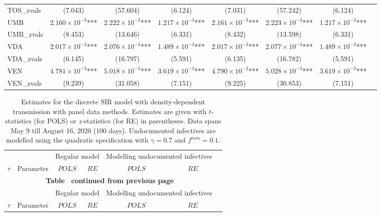 \documentclass[12pt]{article}
\begin{document}
\begin{appendices}
\begin{landscape}
\begin{longtable}{@{}lccccccc@{}}
            TOS\_zvals & (7.043) & (57.604) & (6.124) & (7.031) & (57.242) & (6.124) \\ 
            UMB & $2.160 \times 10^{-3}$*** & $2.222 \times 10^{-3}$*** & $1.217 \times 10^{-3}$*** & $2.161 \times 10^{-3}$*** & $2.223 \times 10^{-3}$*** & $1.217 \times 10^{-3}$*** \\ 
            UMB\_zvals & (8.453) & (13.646) & (6.331) & (8.432) & (13.598) & (6.331) \\ 
            VDA & $2.017 \times 10^{-3}$*** & $2.076 \times 10^{-3}$*** & $1.489 \times 10^{-3}$*** & $2.017 \times 10^{-3}$*** & $2.077 \times 10^{-3}$*** & $1.489 \times 10^{-3}$*** \\ 
            VDA\_zvals & (6.145) & (16.797) & (5.591) & (6.135) & (16.782) & (5.591) \\ 
            VEN & $4.781 \times 10^{-3}$*** & $5.018 \times 10^{-3}$*** & $3.619 \times 10^{-3}$*** & $4.790 \times 10^{-3}$*** & $5.028 \times 10^{-3}$*** & $3.619 \times 10^{-3}$*** \\ 
            VEN\_zvals & (9.239) & (31.058) & (7.151) & (9.225) & (30.853) & (7.151) \\* \bottomrule
    	\end{longtable}
    	\end{landscape}
        
		\begin{longtable}{@{}lcccccc@{}}
		\caption{Estimates for the discrete SIR model with density-dependent transmission with panel data methods. Estimates are given with $t$-statistics (for POLS) or $z$-statistics (for RE) in parentheses. Data spans May 9 till August 16, 2020 (100 days). Undocumented infectives are modelled using the quadratic specification with $\gamma = 0.7$ and $f^{min}=0.1$.}
		\label{tab:results_discrete_panel_density_undoc}\\
		\toprule
		                && \multicolumn{2}{c}{Regular model} & \multicolumn{2}{c}{Modelling undocumented infectives} \\
		                \cmidrule(lr){3-4}
                        \cmidrule(lr){5-6}
		$\tau$          & Parameter & $POLS$ & $RE$ & $POLS$ & $RE$ \\* \midrule
		\endfirsthead
		
		\multicolumn{6}{c}{{\bfseries Table \thetable\ continued from previous page}} \\
		\toprule
		                && \multicolumn{2}{c}{Regular model} & \multicolumn{2}{c}{Modelling undocumented infectives} \\
		                \cmidrule(lr){3-4}
                        \cmidrule(lr){5-6}
		$\tau$          & Parameter & $POLS$ & $RE$ & $POLS$ & $RE$ \\* \midrule
		\endhead
		

\end{longtable}
\end{appendices}
\end{document}
